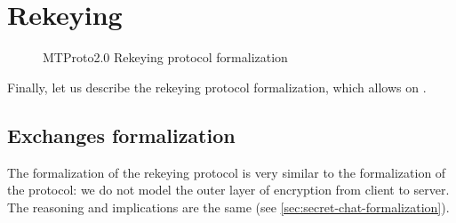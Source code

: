 \section{Rekeying}

\begin{figure}[t]
  \setmscoptions
  \setlength{\instdist}{2.5cm}
  \begin{msc}{}



    \nextlevel[2]

    \nextlevel[4]
    \nextlevel


    \nextlevel[5]
    \nextlevel


    \nextlevel[4]
    \nextlevel[2]

  \end{msc}

  \centering
  \caption{MTProto2.0 Rekeying protocol formalization}
  \label{fig:rekeying-protocol-formalization}
\end{figure}

Finally, let us describe the rekeying protocol formalization, which allows \pfs{} on \schats{}.

\subsection{Exchanges formalization}
The formalization of the rekeying protocol is very similar to the formalization of the \schat{} protocol: we do not model the outer layer of encryption from client to server. The reasoning and implications are the same (see \cref{sec:secret-chat-formalization}).

